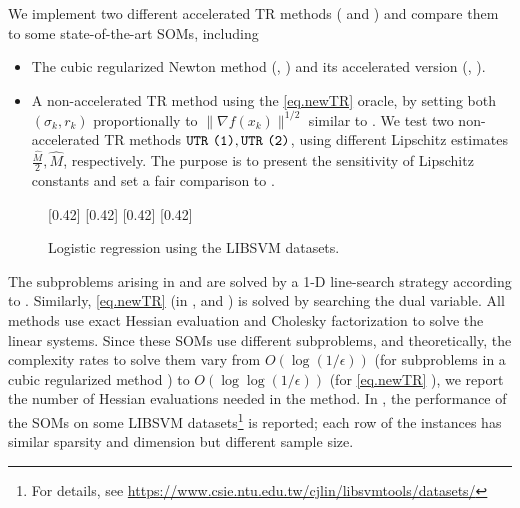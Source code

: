 \documentclass{article}
\begin{document}
We implement two different accelerated TR methods (\atr{} and \atrms{}) and compare them to some state-of-the-art SOMs, including
\begin{itemize}[leftmargin=*]
    \item The cubic regularized Newton method (\arc{}, \citet{nesterov2006cubic}) and its accelerated version (\arca{}, \citet{nesterov2008accelerating}).
    \item A non-accelerated TR method using the \ref{eq.newTR} oracle, by setting both $(\sigma_k, r_k)$ proportionally to $\|\nabla f(x_k)\|^{1/2}$ similar to \cite{jiang2026beyond}.
          We test two non-accelerated TR methods $\texttt{UTR}{}~\texttt{(1)}, \texttt{UTR}{}~\texttt{(2)}$, using different Lipschitz estimates $\tfrac{\widehat M}{2}, \widehat M$, respectively. The purpose is to present the sensitivity of Lipschitz constants and set a fair comparison to \arc{}.
\end{itemize}
\begin{figure}[!t]
    \small
    \centering
    [0.42\columnwidth]{
        \resizebox{0.42\columnwidth}{!}{}
    }
    [0.42\columnwidth]{
        \resizebox{0.42\columnwidth}{!}{}
    }
    [0.42\columnwidth]{
        \resizebox{0.42\columnwidth}{!}{}
    }
    [0.42\columnwidth]{
        \resizebox{0.42\columnwidth}{!}{}
    }

    \caption{Logistic regression using the LIBSVM datasets.}\label{fig.logistic regression}
    \normalsize
\end{figure}

The subproblems arising in \arc{} and \arca{} are solved by a 1-D line-search strategy according to \cite{nesterov2018lectures}. Similarly, \ref{eq.newTR} (in \utr{}, \atr{} and \atrms{}) is solved by searching the dual variable. All methods use exact Hessian evaluation and Cholesky factorization to solve the linear systems.
Since these SOMs use different subproblems, and theoretically, the complexity rates to solve them vary from $O\left(\log\left(1/\epsilon\right)\right)$ (for subproblems in a cubic regularized method \cite{nesterov2006cubic}) to $O\left(\log\log\left(1/\epsilon\right)\right)$ (for \ref{eq.newTR} \cite{ye1991new,vavasis1990proving}),
we report the number of Hessian evaluations needed in the method. In , the performance of the SOMs on some LIBSVM datasets\footnote{For details, see \url{https://www.csie.ntu.edu.tw/cjlin/libsvmtools/datasets/}} is reported; each row of the instances has similar sparsity and dimension but different sample size.
\end{document}
